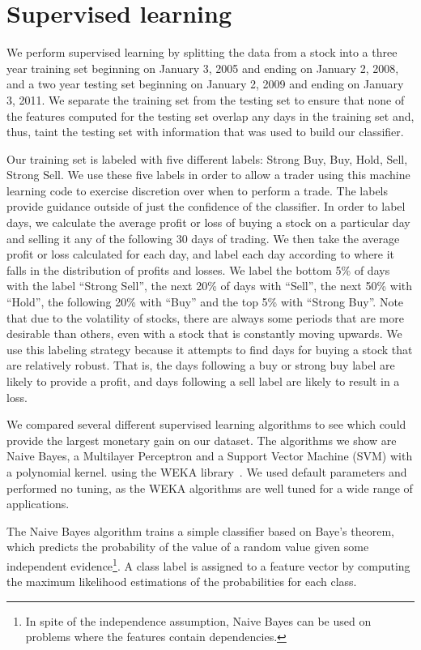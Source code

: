 \documentclass[10pt]{article}
\begin{document}
\section{Supervised learning}
\label{sec:supervisedlearning}

We perform supervised learning by splitting the data from a stock into a three
year training set beginning on January 3, 2005 and ending on January 2, 2008,
and a two year testing set beginning on January 2, 2009 and ending on January 3,
2011. We separate the training set from the testing set to ensure that none of the
features computed for the testing set overlap any days in the training set and,
thus, taint the testing set with information that was used to build our
classifier.

Our training set is labeled with five different labels: Strong Buy, Buy, Hold,
Sell, Strong Sell. We use these five labels in order to allow a trader using
this machine learning code to exercise discretion over when to perform a trade.
The labels provide guidance outside of just the confidence of the classifier.
In order to label days, we calculate the average profit or loss of buying a
stock on a particular day and selling it any of the following 30 days of
trading. We then take the average profit or loss calculated for each day, and
label each day according to where it falls in the distribution of profits and
losses. We label the bottom 5\% of days with the label ``Strong Sell'', the
next 20\% of days with ``Sell'', the next 50\% with ``Hold'', the following
20\% with ``Buy'' and the top 5\% with ``Strong Buy''. Note that due to the
volatility of stocks, there are always some periods that are more desirable
than others, even with a stock that is constantly moving upwards. We use this
labeling strategy because it attempts to find days for buying a stock that are
relatively robust. That is, the days following a buy or strong buy label are
likely to provide a profit, and days following a sell label are likely to
result in a loss.

We compared several different supervised learning algorithms to see which could
provide the largest monetary gain on our dataset. The algorithms we show are
Naive Bayes, a Multilayer Perceptron and a Support Vector Machine
(SVM) with a polynomial kernel. using the WEKA library~\cite{Weka}. We used
default parameters and performed no tuning, as the WEKA algorithms are well
tuned for a wide range of applications.

The Naive Bayes algorithm trains a simple classifier based on Baye's theorem,
which predicts the probability of the value of a random value given some
independent evidence\footnote{In spite of the independence assumption, Naive
Bayes can be used on problems where the features contain dependencies.}. A
class label is assigned to a feature vector by computing the maximum
likelihood estimations of the probabilities for each class.
\end{document}
